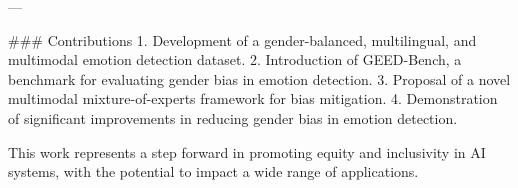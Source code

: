 ---

### Contributions
1. Development of a gender-balanced, multilingual, and multimodal emotion detection dataset.
2. Introduction of GEED-Bench, a benchmark for evaluating gender bias in emotion detection.
3. Proposal of a novel multimodal mixture-of-experts framework for bias mitigation.
4. Demonstration of significant improvements in reducing gender bias in emotion detection.

This work represents a step forward in promoting equity and inclusivity in AI systems, with the potential to impact a wide range of applications.
